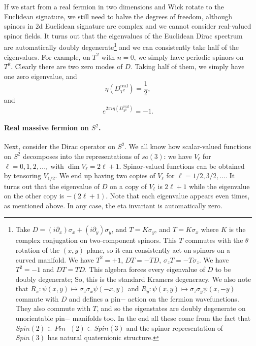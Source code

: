 \documentclass[12pt]{article}
\numberwithin{equation}{section}
\numberwithin{figure}{section}
\theoremstyle{remark}
\begin{document}
If we start from a real fermion in two dimensions and Wick rotate to the Euclidean signature,
we still need to halve the degrees of freedom, although spinors in 2d Euclidean signature are complex
and we cannot consider real-valued spinor fields.
It turns out that the eigenvalues of the Euclidean Dirac spectrum are automatically doubly degenerate\footnote{%
Take $D=(i\partial_x)\sigma_x + (i\partial_y) \sigma_y$,
and $T=K\sigma_y$, 
  and $T=K\sigma_x$ \fi 
where $K$ is the complex conjugation on two-component spinors. 
This $T$ commutes with the $\theta$ rotation of the $(x,y)$-plane, so it can consistently act on spinors on a curved manifold.
We have $T^2=+1$, $DT=-TD$, $\sigma_z T=-T\sigma_z$.
\fi
We have $T^2=-1$ and $DT=TD$. %
This algebra forces every eigenvalue of $D$ to be doubly degenerate;
So, this is the standard Kramers degeneracy.
We also note that $R_x: \psi(x,y)\mapsto \sigma_z\sigma_x \psi(-x,y)$ 
and $R_y:\psi(x,y)\mapsto \sigma_z \sigma_y\psi(x,-y)$ 
commute with $D$ and defines a pin$-$ action on the fermion wavefunctions.
They also commute with $T$, and so the eigenstates are doubly degenerate on unorientable pin$-$ manifolds too.
In the end all these come from the fact that $Spin(2) \subset Pin^-(2)\subset Spin(3)$ and the spinor representation of $Spin(3)$ has natural quaternionic structure.
}
and we can consistently take half of the eigenvalues.
For example, on $T^2$ with $n=0$, we simply have periodic spinors on $T^2$.
Clearly there are two zero modes of $D$. Taking half of them, we simply have one zero eigenvalue,
and \begin{equation}
\eta(D_{T^2}^\text{real}) = \frac12, 
\end{equation} and \begin{equation}
e^{2\pi i\eta(D_{T^2}^\text{real})}=-1.
\end{equation}


\paragraph{Real massive fermion on $S^2$. }
Next, consider the Dirac operator on $S^2$.
We all know how scalar-valued functions on $S^2$ decomposes into the representations of $so(3)$:
we have $V_\ell$ for $\ell=0,1,2,\ldots,$ with $\dim V_\ell=2\ell+1$.
Spinor-valued functions can be obtained by tensoring $V_{1/2}$. We end up having 
two copies of $V_\ell$ for $\ell=1/2,3/2,\ldots$.
It turns out that the eigenvalue of $D$ on a copy of $V_\ell$ is $2\ell+1$ while the eigenvalue on the other copy is $-(2\ell+1)$.
Note that each eigenvalue appears even times, as mentioned above.
In any case, the eta invariant is  automatically zero.
\end{document}
